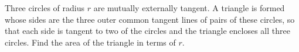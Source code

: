 Three circles of radius $r$ are mutually externally tangent. A triangle is formed whose sides are the three outer common tangent lines of pairs of these circles, so that each side is tangent to two of the circles and the triangle encloses all three circles. Find the area of the triangle in terms of $r$.
